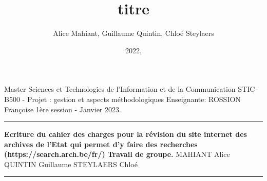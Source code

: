 \documentclass[a4paper,12pt]{article}
\title{titre}
\author{Alice Mahiant, Guillaume Quintin, Chloé Steylaers}
\date{2022,}
\begin{document}
\begin{center}
 \end{center}
 \vspace*{1cm}
 Master Sciences et Technologies de l'Information et de la Communication
 \newline STIC-B500 - Projet : gestion et aspects méthodologiques
   \vspace*{0,5cm}
    \newline Enseignante: ROSSION Françoise
 \newline 1ère session  - Janvier 2023.
  \vspace*{0,5cm}
 \newline \rule{11cm}{0,02cm}
 \vspace*{1,5cm}
 \newline \textbf{{\Large Ecriture du cahier des charges pour la révision du site internet des archives de l'Etat qui permet d'y faire des recherches (https://search.arch.be/fr/)}}
   \vspace*{0,5cm}
 \newline\textbf{{\large Travail de groupe.}}
 \vspace*{1cm}
 \newline MAHIANT Alice
 \newline QUINTIN Guillaume
 \newline STEYLAERS Chloé
 \vspace*{0,5cm}
 \newline \rule{4cm}{0,02cm}
  
\begin{footnotesize}
\newpage
\tableofcontents
\newpage
\end{footnotesize}
\end{document}
